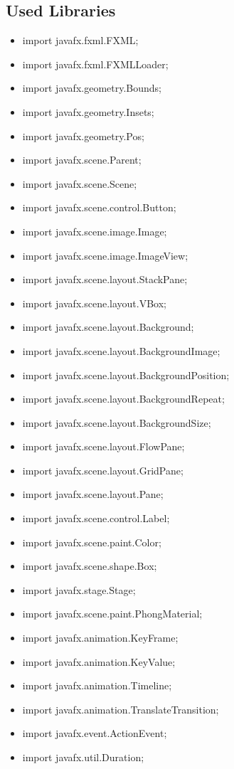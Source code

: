 \documentclass[conference]{IEEEtran}
\begin{document}
\subsection{Used Libraries}
\begin{itemize}
    \item import javafx.fxml.FXML;
    \item import javafx.fxml.FXMLLoader;
    \item import javafx.geometry.Bounds;
    \item import javafx.geometry.Insets;
    \item import javafx.geometry.Pos;
    \item import javafx.scene.Parent;
    \item import javafx.scene.Scene;
    \item import javafx.scene.control.Button;
    \item import javafx.scene.image.Image;
    \item import javafx.scene.image.ImageView;
    \item import javafx.scene.layout.StackPane;
    \item import javafx.scene.layout.VBox;
    \item import javafx.scene.layout.Background;
    \item import javafx.scene.layout.BackgroundImage;
    \item import javafx.scene.layout.BackgroundPosition;
    \item import javafx.scene.layout.BackgroundRepeat;
    \item import javafx.scene.layout.BackgroundSize;
    \item import javafx.scene.layout.FlowPane;
    \item import javafx.scene.layout.GridPane;
    \item import javafx.scene.layout.Pane;
    \item import javafx.scene.control.Label;
    \item import javafx.scene.paint.Color;
    \item import javafx.scene.shape.Box;

    \item import javafx.stage.Stage;
    \item import javafx.scene.paint.PhongMaterial;
    \item import javafx.animation.KeyFrame;
    \item import javafx.animation.KeyValue;
    \item import javafx.animation.Timeline;
    \item import javafx.animation.TranslateTransition;
    \item import javafx.event.ActionEvent;
    \item import javafx.util.Duration;



\end{itemize}
\end{document}

